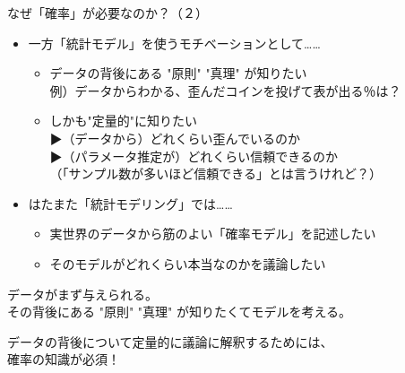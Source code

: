 \documentclass[dvipdfmx,cjk]{beamer}
\begin{document}
\begin{frame}{なぜ「確率」が必要なのか？（２）}


\begin{itemize}

    \item 一方「統計モデル」を使うモチベーションとして……\pause
        \begin{itemize}
        \item データの背後にある "原則" "真理" が知りたい\\\pause
        例）データからわかる、歪んだコインを投げて表が出る％は？\pause
        \item しかも"定量的"に知りたい\\\pause
        ▶（データから）どれくらい歪んでいるのか\\
        ▶（パラメータ推定が）どれくらい信頼できるのか\\
        （「サンプル数が多いほど信頼できる」とは言うけれど？）
        \end{itemize}
        
    \pause
    \item はたまた「統計モデリング」では……
    \pause
        \begin{itemize}
        \item 実世界のデータから筋のよい「確率モデル」を記述したい
        \item そのモデルがどれくらい本当なのかを議論したい
        \end{itemize}

    \pause

\end{itemize}

\vskip 1cm
データがまず与えられる。\\ \pause
その背後にある "原則" "真理" が知りたくてモデルを考える。 \pause

\vskip 1cm
データの背後について定量的に議論に解釈するためには、\\
確率の知識が必須！

\end{frame}
\end{document}
